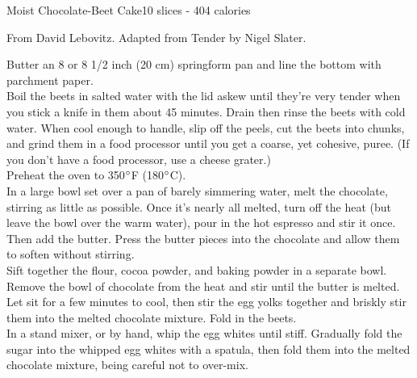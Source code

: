 \begin{recipe}{Moist Chocolate-Beet Cake}{10 slices - 404 calories}{}

\freeform From David Lebovitz. Adapted from {\normalfont Tender} by Nigel Slater.


Butter an 8 or 8 1/2 inch (20 cm) springform pan and line the bottom with parchment paper.\\

Boil the beets in salted water with the lid askew until they’re very tender when you stick a knife in them about 45 minutes. Drain then rinse the beets with cold water. When cool enough to handle, slip off the peels, cut the beets into chunks, and grind them in a food processor until you get a coarse, yet cohesive, puree. (If you don’t have a food processor, use a cheese grater.)\\

Preheat the oven to 350$\degree$F (180$\degree$C).\\

In a large bowl set over a pan of barely simmering water, melt the chocolate, stirring as little as possible. Once it’s nearly all melted, turn off the heat (but leave the bowl over the warm water), pour in the hot espresso and stir it once. Then add the butter. Press the butter pieces into the chocolate and allow them to soften without stirring.\\

Sift together the flour, cocoa powder, and baking powder in a separate bowl.\\

Remove the bowl of chocolate from the heat and stir until the butter is melted. Let sit for a few minutes to cool, then stir the egg yolks together and briskly stir them into the melted chocolate mixture. Fold in the beets.\\

In a stand mixer, or by hand, whip the egg whites until stiff. Gradually fold the sugar into the whipped egg whites with a spatula, then fold them into the melted chocolate mixture, being careful not to over-mix.\\


\end{recipe}
